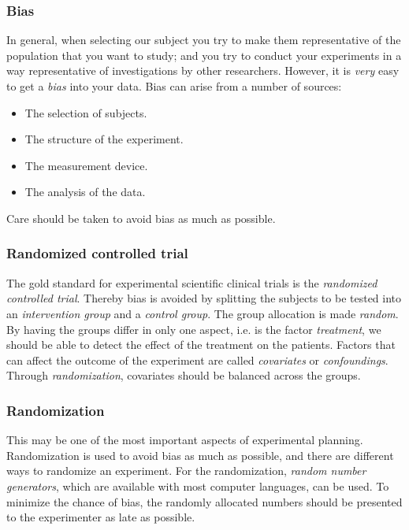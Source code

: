 \subsubsection{Bias} 
In general, when selecting our subject you try to make them representative of the population that you want to study; and you try to conduct your experiments in a way representative of investigations by other researchers. However, it is \emph{very} easy to get a \emph{bias} into your data. Bias can arise from a number of sources:
\begin{itemize}
  \item The selection of subjects.
  \item The structure of the experiment.
  \item The measurement device.
  \item The analysis of the data.
\end{itemize}
Care should be taken to avoid bias as much as possible.

\subsubsection{Randomized controlled trial} 
The gold standard for experimental scientific clinical trials is the \emph{randomized controlled trial}. Thereby bias is avoided by splitting the subjects to be tested into an \emph{intervention group} and a \emph{control group}. The group allocation is made \emph{random}. By having the groups differ in only one aspect, i.e. is the factor \emph{treatment}, we should be able to detect the effect of the treatment on the patients.
Factors that can affect the outcome of the experiment are called \emph{covariates} or \emph{confoundings}. Through \emph{randomization}, covariates should be balanced across the groups.

\subsubsection{Randomization} 
This may be one of the most important aspects of experimental planning. Randomization is used to avoid bias as much as possible, and there are different ways to randomize an experiment. For the randomization, \emph{random number generators}, which are available with most computer languages, can be used. To minimize the chance of bias, the randomly allocated numbers should be presented to the experimenter as late as possible.


